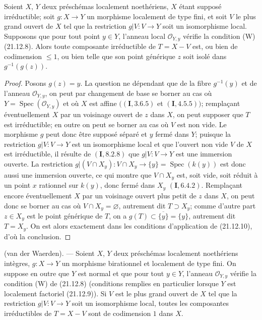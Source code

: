 \begin{corollary}[21.12.11]
\label{IV.21.12.11}
Soient $X$, $Y$ deux préschémas localement noethériens, $X$ étant supposé
irréductible; soit $g:X\to Y$ un morphisme localement de type fini, et soit $V$ le plus
grand ouvert de $X$ tel que la restriction $g|V:V\to Y$ soit un isomorphisme local.
Supposons que pour tout point $y\in Y$, l'anneau local $\mathcal O_{Y,y}$ vérifie la
condition (W) (21.12.8). Alors toute composante irréductible de $T=X-V$ est, ou bien
de codimension $\leq1$, ou bien telle que son point générique $z$ soit isolé dans
$g^{-1}(g(z))$.
\end{corollary}

\begin{proof}
Posons $g(z)=y$. La question ne dépendant que de la fibre $g^{-1}(y)$ et de l'anneau
$\mathcal O_{Y,y}$, on peut par changement de base se borner au cas où
$Y=\operatorname{Spec}(\mathcal O_{Y,y})$ et où $X$ est affine
$((\mathbf I, 3.6.5)$ et $(\mathbf I, 4.5.5))$; remplaçant éventuellement $X$ par un
voisinage ouvert de $z$ dans $X$, on peut supposer que $T$ est irréductible; en outre on
peut se borner au cas où $V$ est non vide. Le morphisme $g$ peut donc être supposé
séparé et $y$ fermé dans $Y$; puisque la restriction $g|V:V\to Y$ est un isomorphisme
local et que l'ouvert non vide $V$ de $X$ est irréductible, il résulte de
$(\mathbf I, 8.2.8)$ que $g|V:V\to Y$ est une immersion ouverte. La restriction
$g|(V\cap X_y):V\cap X_y\to\{y\}=\operatorname{Spec}(k(y))$ est donc aussi une
immersion ouverte, ce qui montre que $V\cap X_y$ est, soit vide, soit réduit à un point
$x$ rationnel
sur $k(y)$, donc fermé dans $X_y$ $(\mathbf I, 6.4.2)$. Remplaçant encore
éventuellement $X$ par un voisinage ouvert plus petit de $z$ dans $X$, on peut donc se
borner au cas où $V\cap X_y=\varnothing$, autrement dit $T\supset X_y$; comme d'autre
part $z\in X_y$ est le point générique de $T$, on a
$g(T)\subset\overline{\{y\}}=\{y\}$, autrement dit $T=X_y$. On est alors exactement
dans les conditions d'application de (21.12.10), d'où la conclusion.
\end{proof}

\begin{theorem}[21.12.12]
\label{IV.21.12.12}
\textup{(van der Waerden)}. ---
Soient $X$, $Y$ deux préschémas localement noethériens intègres, $g:X\to Y$ un
morphisme birationnel et localement de type fini. On suppose en outre que $Y$ est
normal et que pour tout $y\in Y$, l'anneau $\mathcal O_{Y,y}$ vérifie la condition (W)
de (21.12.8) (conditions remplies en particulier lorsque $Y$ est localement factoriel
(21.12.9)). Si $V$ est le plus grand ouvert de $X$ tel que la restriction
$g|V:V\to Y$ soit un isomorphisme local, toutes les composantes irréductibles de
$T=X-V$ sont de codimension $1$ dans $X$.
\end{theorem}

